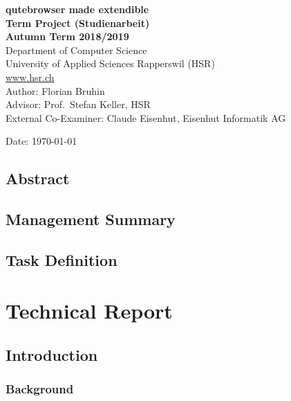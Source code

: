 \documentclass[a4paper,parskip=full]{scrreprt}
\begin{document}
\begin{titlepage}
\begin{flushleft}
{\huge \bfseries qutebrowser made extendible}\\[0.5cm]
{\large \bfseries Term Project (Studienarbeit) \\[0.2cm] Autumn Term 2018/2019}\\[2cm]

Department of Computer Science\\
University of Applied Sciences Rapperswil (HSR)\\
\url{www.hsr.ch}\\[1cm]

Author: Florian Bruhin\\[0.3cm]
Advisor: Prof.~Stefan Keller, HSR\\[0.3cm]
External Co-Examiner: Claude Eisenhut, Eisenhut Informatik AG

\vfill
Date: {\today}

\end{flushleft}

\end{titlepage}



\chapter*{Abstract}

\chapter*{Management Summary}


\tableofcontents
\listoffigures
\listoftables


\chapter*{Task Definition}  

\part{Technical Report}

\chapter{Introduction}

\section{Background}
\end{document}
